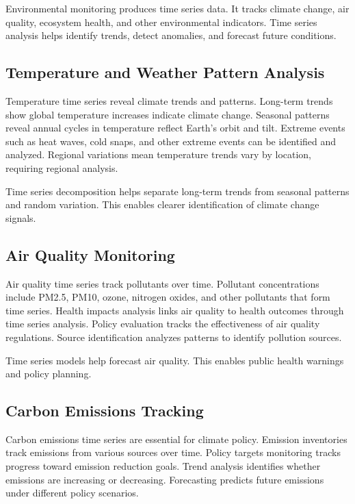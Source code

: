 Environmental monitoring produces time series data. It tracks climate change, air quality, ecosystem health, and other environmental indicators. Time series analysis helps identify trends, detect anomalies, and forecast future conditions.

\subsection{Temperature and Weather Pattern Analysis}

Temperature time series reveal climate trends and patterns. Long-term trends show global temperature increases indicate climate change. Seasonal patterns reveal annual cycles in temperature reflect Earth's orbit and tilt. Extreme events such as heat waves, cold snaps, and other extreme events can be identified and analyzed. Regional variations mean temperature trends vary by location, requiring regional analysis.

Time series decomposition helps separate long-term trends from seasonal patterns and random variation. This enables clearer identification of climate change signals.

\subsection{Air Quality Monitoring}

Air quality time series track pollutants over time. Pollutant concentrations include PM2.5, PM10, ozone, nitrogen oxides, and other pollutants that form time series. Health impacts analysis links air quality to health outcomes through time series analysis. Policy evaluation tracks the effectiveness of air quality regulations. Source identification analyzes patterns to identify pollution sources.

Time series models help forecast air quality. This enables public health warnings and policy planning.

\subsection{Carbon Emissions Tracking}

Carbon emissions time series are essential for climate policy. Emission inventories track emissions from various sources over time. Policy targets monitoring tracks progress toward emission reduction goals. Trend analysis identifies whether emissions are increasing or decreasing. Forecasting predicts future emissions under different policy scenarios.

